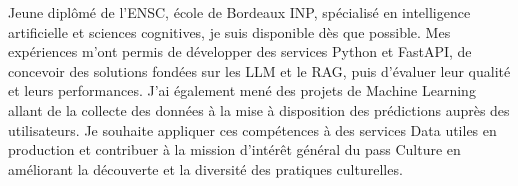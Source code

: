 
\begin{cvparagraph}
Jeune diplômé de l’ENSC, école de Bordeaux INP, spécialisé en intelligence artificielle et sciences cognitives, je suis disponible dès que possible. Mes expériences m’ont permis de développer des services Python et FastAPI, de concevoir des solutions fondées sur les LLM et le RAG, puis d’évaluer leur qualité et leurs performances. J’ai également mené des projets de Machine Learning allant de la collecte des données à la mise à disposition des prédictions auprès des utilisateurs. Je souhaite appliquer ces compétences à des services Data utiles en production et contribuer à la mission d’intérêt général du pass Culture en améliorant la découverte et la diversité des pratiques culturelles.
\end{cvparagraph}
